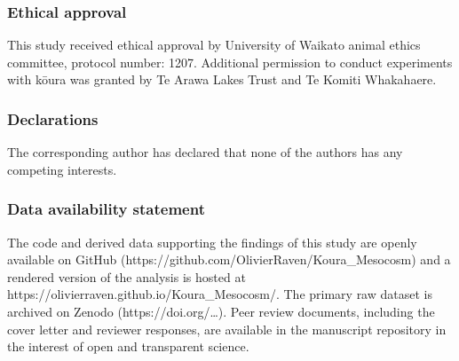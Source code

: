 \documentclass[
  letterpaper,
  DIV=11,
  numbers=noendperiod]{scrartcl}
\newcounter{none} %
\begin{document}
\subsubsection{Ethical approval}\label{ethical-approval}

This study received ethical approval by University of Waikato animal
ethics committee, protocol number: 1207. Additional permission to
conduct experiments with kōura was granted by Te Arawa Lakes Trust and
Te Komiti Whakahaere.

\subsubsection{Declarations}\label{declarations}

The corresponding author has declared that none of the authors has any
competing interests.

\subsubsection{Data availability
statement}\label{data-availability-statement}

The code and derived data supporting the findings of this study are
openly available on GitHub
(https://github.com/OlivierRaven/Koura\_Mesocosm) and a rendered version
of the analysis is hosted at
https://olivierraven.github.io/Koura\_Mesocosm/. The primary raw dataset
is archived on Zenodo (https://doi.org/\ldots). Peer review documents,
including the cover letter and reviewer responses, are available in the
manuscript repository in the interest of open and transparent science.
\end{document}
